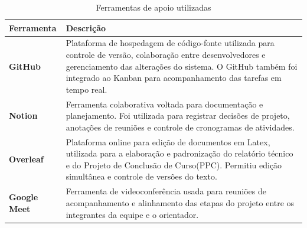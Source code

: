 \begin{table}[H]
\centering
\caption{Ferramentas de apoio utilizadas}
\label{tab:ferramentas-apoio}
\begin{tabular}{|p{3cm}|p{11cm}|}
\hline
\textbf{Ferramenta} & \textbf{Descrição} \\ \hline

\textbf{GitHub} & Plataforma de hospedagem de código-fonte utilizada para controle de versão, colaboração entre desenvolvedores e gerenciamento das alterações do sistema. O GitHub também foi integrado ao Kanban para acompanhamento das tarefas em tempo real. \\ \hline

\textbf{Notion} & Ferramenta colaborativa voltada para documentação e planejamento. Foi utilizada para registrar decisões de projeto, anotações de reuniões e controle de cronogramas de atividades. \\ \hline

\textbf{Overleaf} & Plataforma online para edição de documentos em Latex, utilizada para a elaboração e padronização do relatório técnico e do Projeto de Conclusão de Curso(PPC). Permitiu edição simultânea e controle de versões do texto. \\ \hline

\textbf{Google Meet} & Ferramenta de videoconferência usada para reuniões de acompanhamento e alinhamento das etapas do projeto entre os integrantes da equipe e o orientador. \\ \hline


\end{tabular}
\end{table}